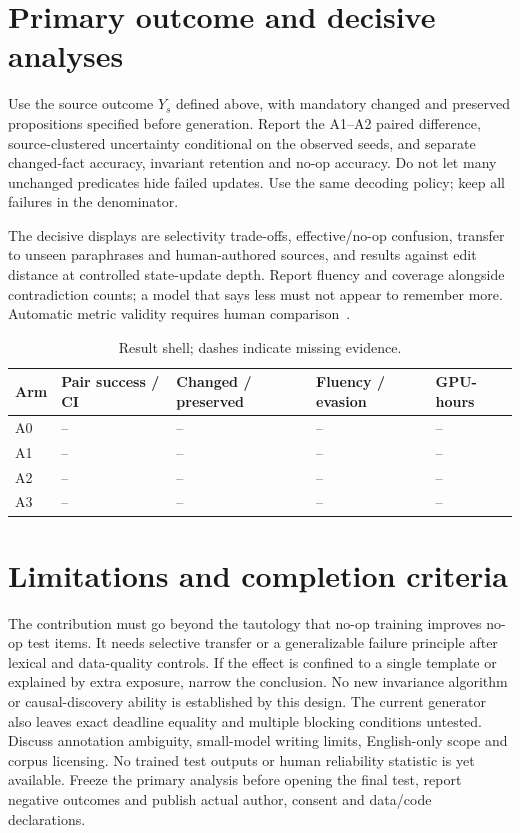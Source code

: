 \documentclass[11pt,a4paper]{article}
\begin{document}


\section{Primary outcome and decisive analyses}
Use the source outcome $Y_s$ defined above, with mandatory changed and preserved
propositions specified before generation. Report the A1--A2 paired difference,
source-clustered uncertainty conditional on the observed seeds, and separate
changed-fact accuracy, invariant retention and no-op accuracy. Do not let many
unchanged predicates hide failed updates. Use the same decoding policy; keep
all failures in the denominator.

The decisive displays are selectivity trade-offs, effective/no-op confusion,
transfer to unseen paraphrases and human-authored sources, and results against
edit distance at controlled state-update depth. Report fluency and coverage
alongside contradiction counts; a model that says less must not appear to
remember more. Automatic metric validity requires human comparison~\cite{openmeva}.

\begin{table}[ht]\centering\small
\caption{Result shell; dashes indicate missing evidence.}
\begin{tabularx}{\linewidth}{lYYYY}\toprule
Arm & Pair success / CI & Changed / preserved & Fluency / evasion & GPU-hours\\\midrule
A0 & -- & -- & -- & --\\A1 & -- & -- & -- & --\\
A2 & -- & -- & -- & --\\A3 & -- & -- & -- & --\\
\bottomrule\end{tabularx}\end{table}

\section{Limitations and completion criteria}
The contribution must go beyond the tautology that no-op training improves
no-op test items. It needs selective transfer or a generalizable failure
principle after lexical and data-quality controls. If the effect is confined to
a single template or explained by extra exposure, narrow the conclusion.
No new invariance algorithm or causal-discovery ability is established by this
design. The current generator also leaves exact deadline equality and multiple
blocking conditions untested. Discuss annotation ambiguity, small-model writing limits, English-only
scope and corpus licensing. No trained test outputs or human reliability statistic is yet
available. Freeze the primary analysis before opening the final test, report
negative outcomes and publish actual author, consent and data/code declarations.



\end{document}
